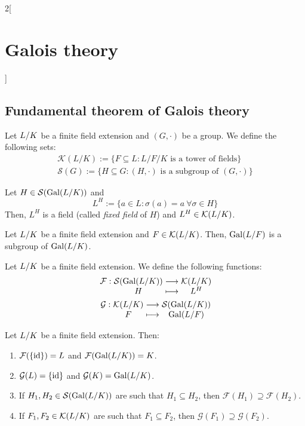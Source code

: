 \documentclass[../../../main.tex]{subfiles}
\begin{document}
\begin{multicols}{2}[\section{Galois theory}]
  \subsection{Fundamental theorem of Galois theory}
  \begin{definition}
    Let $\quot{L}{K}$ be a finite field extension and $(G,\cdot)$ be a group. We define the following sets:
    \begin{gather*}
      \mathcal{K}(L/K):=\{F\subseteq L:L/F/K\text{ is a tower of fields}\}\\
      \mathcal{S}(G):=\{H\subseteq G:(H,\cdot)\text{ is a subgroup of }(G,\cdot)\}
    \end{gather*}
  \end{definition}
  \begin{lemma}
    Let $H\in\mathcal{S}(\Gal(\quot{L}{K}))$ and $$L^H:=\{a\in L:\sigma(a)=a\ \forall\sigma\in H\}$$
    Then, $L^H$ is a field (called \emph{fixed field} of $H$) and $L^H\in\mathcal{K}(\quot{L}{K})$.
  \end{lemma}
  \begin{lemma}
    Let $\quot{L}{K}$ be a finite field extension and $F\in \mathcal{K}(\quot{L}{K})$. Then, $\Gal(\quot{L}{F})$ is a subgroup of $\Gal(\quot{L}{K})$.
  \end{lemma}
  \begin{definition}
    Let $\quot{L}{K}$ be a finite field extension. We define the following functions:
    \begin{gather*}
      \function{\mathcal{F}}{\mathcal{S}(\Gal(\quot{L}{K}))}{\mathcal{K}(\quot{L}{K})}{H}{L^H}\\
      \function{\mathcal{G}}{\mathcal{K}(\quot{L}{K})}{\mathcal{S}(\Gal(\quot{L}{K}))}{F}{\Gal(\quot{L}{F})}
    \end{gather*}
  \end{definition}
  \begin{prop}
    Let $\quot{L}{K}$ be a finite field extension. Then:
    \begin{enumerate}
      \item $\mathcal{F}(\{\mathrm{id}\})=L$ and $\mathcal{F}(\Gal(\quot{L}{K}))=K$.
      \item $\mathcal{G}(L)=\{\mathrm{id}\}$ and $\mathcal{G}(K)=\Gal(\quot{L}{K})$.
      \item If $H_1,H_2\in\mathcal{S}(\Gal(\quot{L}{K}))$ are such that $H_1\subseteq H_2$, then $\mathcal{F}(H_1)\supseteq \mathcal{F}(H_2)$.
      \item If $F_1,F_2\in\mathcal{K}(\quot{L}{K})$ are such that $F_1\subseteq F_2$, then $\mathcal{G}(F_1)\supseteq \mathcal{G}(F_2)$.

\end{enumerate}
\end{prop}
\end{multicols}
\end{document}
